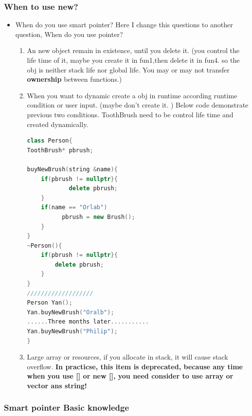 \documentclass[a4paper,12pt,twoside]{book}
\begin{document}
\subsubsection{When to use new?}
\begin{itemize}

\item When do you use smart pointer? Here I change this questions to another question, When do you use pointer?
\begin{enumerate}
\item An new object remain in existence, until you delete it. (you control the life time of it, maybe you create it in fun1,then delete it in fun4. so the obj is neither stack life nor global life. You may or may not transfer \textbf{ownership} between functions.)

\item When you want to dynamic create a obj in runtime according runtime condition or user input. (maybe don't create it. ) Below code demonstrate previous two conditions.  ToothBrush need to be control life time and created dynamically.
\begin{lstlisting}[frame=single, language=c++]
class Person{
ToothBrush* pbrush;

buyNewBrush(string &name){
    if(pbrush != nullptr}{
	    	delete pbrush;
    }
    if(name == "Orlab")
          pbrush = new Brush();
    }
}
~Person(){
	if(pbrush != nullptr}{
		delete pbrush;
    }
}
///////////////////
Person Yan();
Yan.buyNewBrush("Oralb");
......Three months later...........
Yan.buyNewBrush("Philip");
}
\end{lstlisting}

\item Large array or resources,  if you allocate in stack, it will cause stack overflow. \textbf{In practicse, this item is deprecated, because any time when you use [] or new [], you need consider to use array or vector ans string!}
\end{enumerate}

\end{itemize}


\subsubsection{Smart pointer Basic knowledge}
\end{document}
